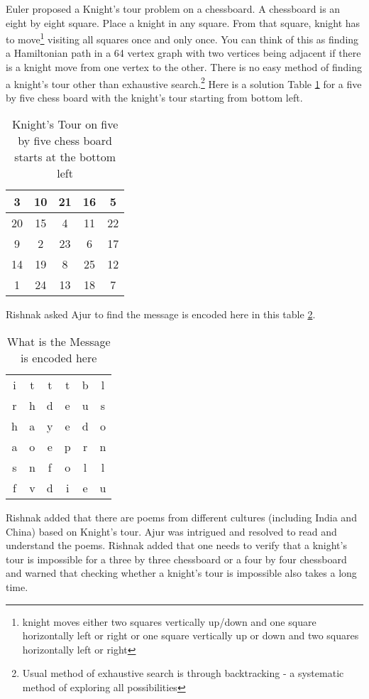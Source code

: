 Euler proposed a Knight's tour problem on a chessboard. A chessboard is an eight by eight square. Place a knight in any square. From that square, knight has to move\footnote{knight moves either two squares vertically up/down and one square horizontally left or right or one square vertically up or down and two squares horizontally left or right} visiting all squares once and only once. You can think of this as finding a Hamiltonian path in a 64 vertex graph with two vertices being adjacent if there is a knight move from one vertex to the other. There is no easy method of finding a knight's tour other than exhaustive search.\footnote{Usual method of exhaustive search is through backtracking - a systematic method of exploring all possibilities} Here is a solution Table \ref{5t1} for a five by five chess board with the knight's tour starting from bottom left.
\begin{table}
\centering
\begin{tabular}{|c |c |c| c| c|} 
 \hline
3&10&21&16& 5\\
\hline
20&15& 4&11&22\\
\hline
 9& 2&23& 6&17\\
 \hline
14&19& 8&25&12\\
\hline
 1&24&13&18& 7\\
 \hline
\end{tabular}
\caption{Knight's Tour on five by five chess board starts at the bottom left}
\label{5t1}
\end{table}
Rishnak asked Ajur to find the message is encoded here in this table \ref{5t2}.
\begin{table}
\centering
\begin{tabular}{c c c c cc}
i& t& t& t& b& l\\
r& h &d &e& u& s\\
h& a& y& e& d& o\\
a& o& e& p& r& n\\
s& n& f& o& l& l\\
f& v& d &i& e& u\\
\end{tabular}
\caption{What is the Message is encoded here}
\label{5t2}
\end{table}
Rishnak added that there are poems from different cultures (including India and China) based on Knight's tour. Ajur was intrigued and resolved to read and understand the poems. Rishnak added that one needs to verify that a knight's tour is impossible for a three by three chessboard or a four by four chessboard and warned that checking whether a knight's tour is impossible also takes a long time.

